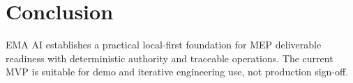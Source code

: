 \section{Conclusion}
EMA AI establishes a practical local-first foundation for MEP deliverable readiness with deterministic authority and traceable operations. The current MVP is suitable for demo and iterative engineering use, not production sign-off.
